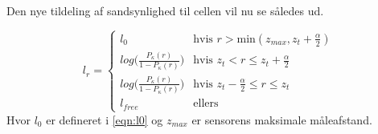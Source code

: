 Den nye tildeling af sandsynlighed til cellen vil nu se således ud.


\begin{equation}
	l_{r} = \begin{cases} 
		l_0 &\text{hvis }r > \text{min}(z_{max},z_t+\frac{\alpha}{2}) \\
		log\Big(\frac{P_\kappa(r)}{1-P_\kappa(r)}\Big) &\text{hvis } z_t < r \leq z_t+\frac{\alpha}{2} \\
		log\Big(\frac{P_\kappa(r)}{1-P_\kappa(r)}\Big) &\text{hvis } z_t-\frac{\alpha}{2} \leq r \leq z_t \\
		l_{free} &\text{ellers}	
	\end{cases} 
\end{equation}
Hvor $l_0$ er defineret i \cref{eqn:l0} og $z_{max}$ er sensorens maksimale måleafstand.



